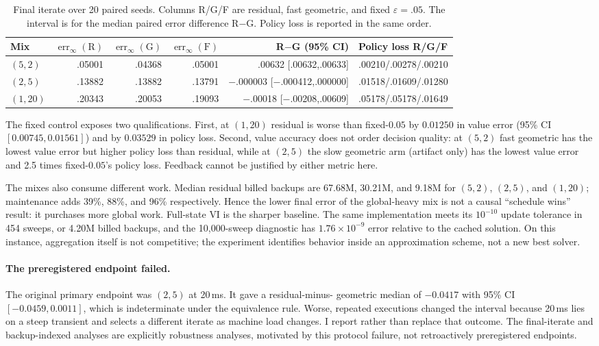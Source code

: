 \documentclass{article}
\newcommand{\err}{\operatorname{err}_{\infty}}
\newcommand{\VI}{\textsc{VI}}
\begin{document}
\begin{table}[t]
  \centering
  \small
  \setlength{\tabcolsep}{4.2pt}
  \caption{Final iterate over 20 paired seeds.  Columns R/G/F are residual,
  fast geometric, and fixed $\varepsilon=.05$.  The interval is for the median
  paired error difference R$-$G.  Policy loss is reported in the same order.}
  \label{tab:final}
  \begin{tabular}{@{}lrrrrl@{}}
    \toprule
    Mix & $\err(\mathrm R)$ & $\err(\mathrm G)$ & $\err(\mathrm F)$ & R$-$G (95\% CI)
      & Policy loss R/G/F \\
    \midrule
    $(5,2)$  & .05001 & .04368 & .05001 & .00632 [.00632,.00633]
      & .00210/.00278/.00210 \\
    $(2,5)$  & .13882 & .13882 & .13791 & $-$.000003 [$-$.000412,.000000]
      & .01518/.01609/.01280 \\
    $(1,20)$ & .20343 & .20053 & .19093 & $-$.00018 [$-$.00208,.00609]
      & .05178/.05178/.01649 \\
    \bottomrule
  \end{tabular}
\end{table}

The fixed control exposes two qualifications.  First, at $(1,20)$ residual is
worse than fixed-$0.05$ by $0.01250$ in value error (95\% CI
$[0.00745,0.01561]$) and by $0.03529$ in policy loss.  Second, value accuracy
does not order decision quality: at $(5,2)$ fast geometric has the lowest value
error but higher policy loss than residual, while at $(2,5)$ the slow geometric
arm (artifact only) has the lowest value error and 2.5 times fixed-$0.05$'s
policy loss.  Feedback cannot be justified by either metric here.

The mixes also consume different work.  Median residual billed backups are
67.68M, 30.21M, and 9.18M for $(5,2)$, $(2,5)$, and $(1,20)$; maintenance adds
39\%, 88\%, and 96\% respectively.  Hence the lower final error of the
global-heavy mix is not a causal ``schedule wins'' result: it purchases more
global work.  Full-state \VI{} is the sharper baseline.  The same implementation
meets its $10^{-10}$ update tolerance in 454 sweeps, or 4.20M billed backups,
and the 10,000-sweep diagnostic has $1.76\times10^{-9}$ error relative to the
cached solution.  On this instance, aggregation itself is not competitive;
the experiment identifies behavior inside an approximation scheme, not a new
best solver.

\paragraph{The preregistered endpoint failed.}
The original primary endpoint was $(2,5)$ at 20\,ms.  It gave a residual-minus-
geometric median of $-0.0417$ with 95\% CI $[-0.0459,0.0011]$, which is
indeterminate under the equivalence rule.  Worse, repeated executions changed
the interval because 20\,ms lies on a steep transient and selects a different
iterate as machine load changes.  I report rather than replace that outcome.
The final-iterate and backup-indexed analyses are explicitly robustness
analyses, motivated by this protocol failure, not retroactively preregistered
endpoints.
\end{document}
